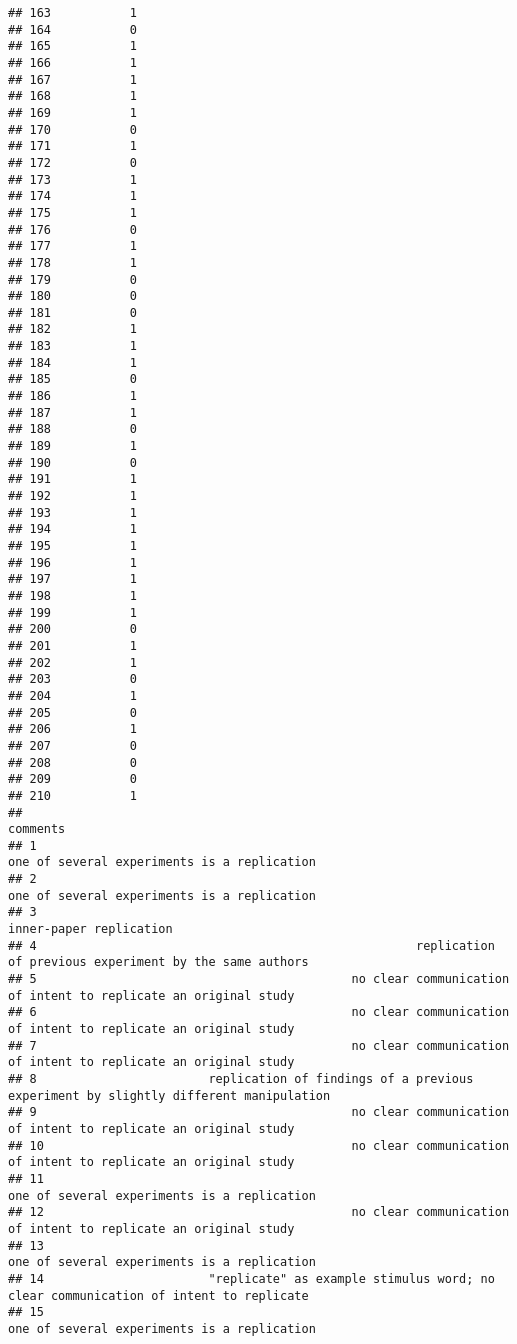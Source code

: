 \documentclass[
  english,
  man]{apa6}
\begin{document}
\begin{verbatim}
## 163           1
## 164           0
## 165           1
## 166           1
## 167           1
## 168           1
## 169           1
## 170           0
## 171           1
## 172           0
## 173           1
## 174           1
## 175           1
## 176           0
## 177           1
## 178           1
## 179           0
## 180           0
## 181           0
## 182           1
## 183           1
## 184           1
## 185           0
## 186           1
## 187           1
## 188           0
## 189           1
## 190           0
## 191           1
## 192           1
## 193           1
## 194           1
## 195           1
## 196           1
## 197           1
## 198           1
## 199           1
## 200           0
## 201           1
## 202           1
## 203           0
## 204           1
## 205           0
## 206           1
## 207           0
## 208           0
## 209           0
## 210           1
##                                                                                                     comments
## 1                                                                one of several experiments is a replication
## 2                                                                one of several experiments is a replication
## 3                                                                                    inner-paper replication
## 4                                                     replication of previous experiment by the same authors
## 5                                            no clear communication of intent to replicate an original study
## 6                                            no clear communication of intent to replicate an original study
## 7                                            no clear communication of intent to replicate an original study
## 8                        replication of findings of a previous experiment by slightly different manipulation
## 9                                            no clear communication of intent to replicate an original study
## 10                                           no clear communication of intent to replicate an original study
## 11                                                               one of several experiments is a replication
## 12                                           no clear communication of intent to replicate an original study
## 13                                                               one of several experiments is a replication
## 14                       "replicate" as example stimulus word; no clear communication of intent to replicate
## 15                                                               one of several experiments is a replication

\end{verbatim}
\end{document}
